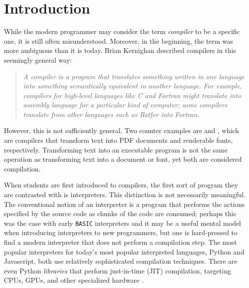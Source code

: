 \chapter{Introduction}

While the modern programmer may consider the term \emph{compiler} to be a specific one,
it is still often misunderstood.
Moreover, in the beginning, the term was more ambiguous than it is today.
Brian Kernighan described compilers in this seemingly general way\cite{new-history-of-modern-computing}:

\begin{quotation}
\textit{
A compiler is a program that translates something written in one language into something semantically equivalent in another language.
For example, compilers for high-level languages like C and Fortran might translate into assembly language for a particular kind of computer; some compilers translate from other languages such as Ratfor into Fortran.
}
\end{quotation}

However, this is not sufficiently general.
Two counter examples are \tex and \metafont, which are compilers that
transform text into PDF documents and renderable fonts, respectively.
Transforming text into an executable program is not the same operation as
transforming text into a document or font, yet both are considered compilation.

When students are first introduced to compilers,
the first sort of program they are contrasted with is interpreters.
This distinction is not necessarily meaningful.
The conventional notion of an interpreter is a program that performs the actions
specified by the source code as chunks of the code are consumed;
perhaps this was the case with early \texttt{BASIC} interpreters
and it may be a useful mental model when introducing interpreters to new programmers,
but one is hard-pressed to find a modern interpreter that does not perform a compilation step.
The most popular interpreters for today's most popular interpreted languages,
Python and Javascript, both use relatively sophisticated compilation techniques.
There are even Python \textit{libraries} that perform
just-in-time (JIT) compilation, targeting CPUs, GPUs, and other specialized hardware
\cite{jax-compiler}\cite{lam-numba}\cite{numba_cuda}\cite{triton-tillet}.

